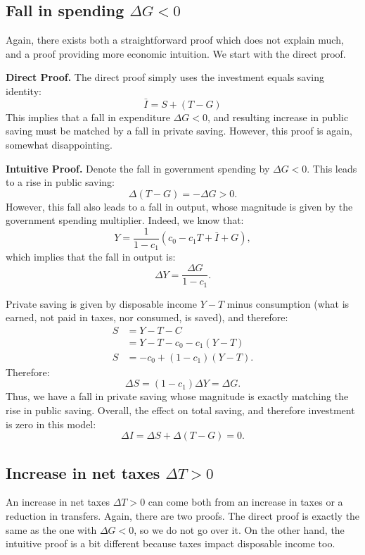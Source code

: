 \documentclass[]{book}
\begin{document}
\subsection{\texorpdfstring{Fall in spending
\(\Delta G<0\)}{Fall in spending \textbackslash{}Delta G\textless{}0}}\label{fall-in-spending-delta-g0}

Again, there exists both a straightforward proof which does not explain
much, and a proof providing more economic intuition. We start with the
direct proof.

\textbf{Direct Proof.} The direct proof simply uses the investment
equals saving identity: \[\bar{I} = S + (T-G)\] This implies that a fall
in expenditure \(\Delta G<0\), and resulting increase in public saving
must be matched by a fall in private saving. However, this proof is
again, somewhat disappointing.

\textbf{Intuitive Proof.} Denote the fall in government spending by
\(\Delta G<0\). This leads to a rise in public saving:
\[\Delta(T-G)=-\Delta G>0.\] However, this fall also leads to a fall in
output, whose magnitude is given by the government spending multiplier.
Indeed, we know that:
\[Y=\frac{1}{1-c_{1}}\left(c_{0}-c_{1}T+\bar{I}+G\right),\] which
implies that the fall in output is:
\[\Delta Y=\frac{\Delta G}{1-c_{1}}.\]

Private saving is given by disposable income \(Y-T\) minus consumption
(what is earned, not paid in taxes, nor consumed, is saved), and
therefore: \[
\begin{aligned}
S   &= Y-T-C\\
&= Y-T-c_{0}-c_{1}\left(Y-T\right)\\
S   &=-c_{0}+\left(1-c_{1}\right)\left(Y-T\right).
\end{aligned}
\] Therefore: \[\Delta S=(1-c_{1})\Delta Y=\Delta G.\] Thus, we have a
fall in private saving whose magnitude is exactly matching the rise in
public saving. Overall, the effect on total saving, and therefore
investment is zero in this model: \[\Delta I  =\Delta S+\Delta(T-G)=0.\]

\subsection{\texorpdfstring{Increase in net taxes
\(\Delta T>0\)}{Increase in net taxes \textbackslash{}Delta T\textgreater{}0}}\label{increase-in-net-taxes-delta-t0}

An increase in net taxes \(\Delta T>0\) can come both from an increase
in taxes or a reduction in transfers. Again, there are two proofs. The
direct proof is exactly the same as the one with \(\Delta G<0\), so we
do not go over it. On the other hand, the intuitive proof is a bit
different because taxes impact disposable income too.
\end{document}
